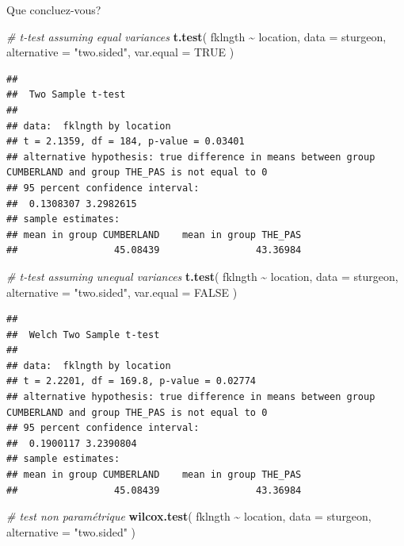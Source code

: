 \documentclass[
  12pt,
]{book}
\newenvironment{Shaded}{\begin{snugshade}}{\end{snugshade}}
\newcommand{\CommentTok}[1]{\textcolor[rgb]{0.56,0.35,0.01}{\textit{#1}}}
\newcommand{\DataTypeTok}[1]{\textcolor[rgb]{0.13,0.29,0.53}{#1}}
\newcommand{\KeywordTok}[1]{\textcolor[rgb]{0.13,0.29,0.53}{\textbf{#1}}}
\newcommand{\NormalTok}[1]{#1}
\newcommand{\OperatorTok}[1]{\textcolor[rgb]{0.81,0.36,0.00}{\textbf{#1}}}
\newcommand{\OtherTok}[1]{\textcolor[rgb]{0.56,0.35,0.01}{#1}}
\newcommand{\StringTok}[1]{\textcolor[rgb]{0.31,0.60,0.02}{#1}}
\begin{document}
Que concluez-vous?

\begin{Shaded}
\begin{Highlighting}[]
\CommentTok{\# t{-}test assuming equal variances}
\KeywordTok{t.test}\NormalTok{(}
\NormalTok{  fklngth }\OperatorTok{\textasciitilde{}}\StringTok{ }\NormalTok{location,}
  \DataTypeTok{data =}\NormalTok{ sturgeon,}
  \DataTypeTok{alternative =} \StringTok{"two.sided"}\NormalTok{,}
  \DataTypeTok{var.equal =} \OtherTok{TRUE}
\NormalTok{)}
\end{Highlighting}
\end{Shaded}

\begin{verbatim}
## 
##  Two Sample t-test
## 
## data:  fklngth by location
## t = 2.1359, df = 184, p-value = 0.03401
## alternative hypothesis: true difference in means between group CUMBERLAND and group THE_PAS is not equal to 0
## 95 percent confidence interval:
##  0.1308307 3.2982615
## sample estimates:
## mean in group CUMBERLAND    mean in group THE_PAS 
##                 45.08439                 43.36984
\end{verbatim}

\begin{Shaded}
\begin{Highlighting}[]
\CommentTok{\# t{-}test assuming unequal variances}
\KeywordTok{t.test}\NormalTok{(}
\NormalTok{  fklngth }\OperatorTok{\textasciitilde{}}\StringTok{ }\NormalTok{location,}
  \DataTypeTok{data =}\NormalTok{ sturgeon,}
  \DataTypeTok{alternative =} \StringTok{"two.sided"}\NormalTok{,}
  \DataTypeTok{var.equal =} \OtherTok{FALSE}
\NormalTok{)}
\end{Highlighting}
\end{Shaded}

\begin{verbatim}
## 
##  Welch Two Sample t-test
## 
## data:  fklngth by location
## t = 2.2201, df = 169.8, p-value = 0.02774
## alternative hypothesis: true difference in means between group CUMBERLAND and group THE_PAS is not equal to 0
## 95 percent confidence interval:
##  0.1900117 3.2390804
## sample estimates:
## mean in group CUMBERLAND    mean in group THE_PAS 
##                 45.08439                 43.36984
\end{verbatim}

\begin{Shaded}
\begin{Highlighting}[]
\CommentTok{\# test non paramétrique}
\KeywordTok{wilcox.test}\NormalTok{(}
\NormalTok{  fklngth }\OperatorTok{\textasciitilde{}}\StringTok{ }\NormalTok{location,}
  \DataTypeTok{data =}\NormalTok{ sturgeon,}
  \DataTypeTok{alternative =} \StringTok{"two.sided"}
\NormalTok{)}
\end{Highlighting}
\end{Shaded}
\end{document}
